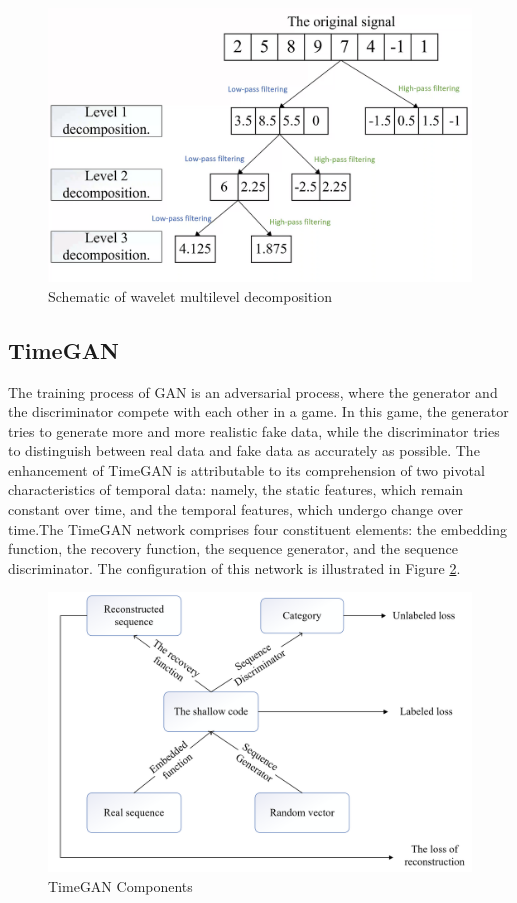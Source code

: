 \documentclass[journal,article,submit,pdftex,moreauthors]{Definitions/mdpi}
\begin{document}
\begin{figure}[h]
    \centering
    \includegraphics[width=0.75\linewidth]{图片/小波变换.png}
    \caption{Schematic of wavelet multilevel decomposition}
    \label{fig:Wavelet Transform}
\end{figure}


\subsection{TimeGAN }

The training process of GAN is an adversarial process, where the generator and the discriminator compete with each other in a game. In this game, the generator tries to generate more and more realistic fake data, while the discriminator tries to distinguish between real data and fake data as accurately as possible. The enhancement of TimeGAN \cite{Yoon2019} is attributable to its comprehension of two pivotal characteristics of temporal data: namely, the static features, which remain constant over time, and the temporal features, which undergo change over time.The TimeGAN network comprises four constituent elements: the embedding function, the recovery function, the sequence generator, and the sequence discriminator. The configuration of this network is illustrated in Figure \ref{fig:timegan}.  


\begin{figure}[h]
    \centering
    \includegraphics[width=0.75\linewidth]{图片/timegan组成.png}
    \caption{TimeGAN Components}
    \label{fig:timegan}
\end{figure}
\end{document}
